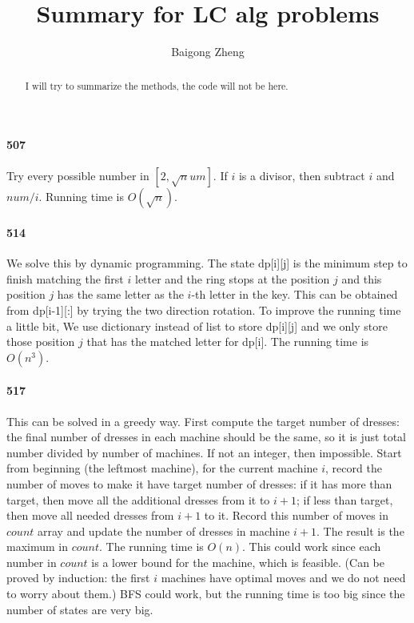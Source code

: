 \documentclass[11pt]{article}
\begin{document}
\title{
{Summary for LC alg problems}
}
\author{Baigong Zheng}
\date{}
\maketitle
\begin{abstract}
I will try to summarize the methods, the code will not be here.
\end{abstract}

\paragraph{507}
Try every possible number in $[2, \sqrt num]$. If $i$ is a divisor, then subtract $i$ and $num/i$. 
Running time is $O(\sqrt n)$.

\paragraph{514}
We solve this by dynamic programming.
The state dp[i][j] is the minimum step to finish matching the first $i$ letter and the ring stops at the position $j$ and 
this position $j$ has the same letter as the $i$-th letter in the key. This can be obtained from dp[i-1][:] by trying the 
two direction rotation. To improve the running time a little bit, We use dictionary instead of list to store dp[i][j] and
we only store those position $j$ that has the matched letter for dp[i].
The running time is $O(n^3)$.

\paragraph{517}
This can be solved in a greedy way. 
First compute the target number of dresses: the final number of dresses in each machine should be the same, so it is just total number divided by number of machines. If not an integer, then impossible.
Start from beginning (the leftmost machine), for the current machine $i$, record the number of moves to make it have target number of dresses: if it has more than target, then move all the additional dresses from it to $i+1$; if less than target, then move all needed dresses from $i+1$ to it. 
Record this number of moves in $count$ array and update the number of dresses in machine $i+1$.
The result is the maximum in $count$.
The running time is $O(n)$.
This could work since each number in $count$ is a lower bound for the machine, which is feasible. (Can be proved by induction: the first $i$ machines have optimal moves and we do not need to worry about them.)
BFS could work, but the running time is too big since the number of states are very big.
\end{document}
